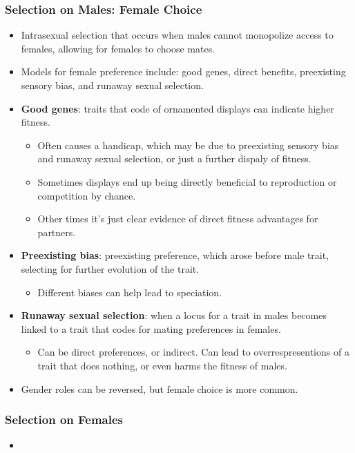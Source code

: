 \documentclass[12pt,a4paper]{article}
\begin{document}
\begin{itemize}
    \subsubsection{Selection on Males: Female Choice}
    \begin{itemize}
        \item Intrasexual selection that occurs when males cannot monopolize access to females, allowing for females to choose mates.
        \item Models for female preference include: good genes, direct benefits, preexisting sensory bias, and runaway sexual selection.
        \item \textbf{Good genes}: traits that code of ornamented displays can indicate higher fitness.
            \begin{itemize}
                \item Often causes a handicap, which may be due to preexisting sensory bias and runaway sexual selection, or just a further dispaly of fitness.
                \item Sometimes displays end up being directly beneficial to reproduction or competition by chance.
                \item Other times it's just clear evidence of direct fitness advantages for partners.
            \end{itemize}
        \item \textbf{Preexisting bias}: preexisting preference, which arose before male trait, selecting for further evolution of the trait.
            \begin{itemize}
                \item Different biases can help lead to speciation.
            \end{itemize}
        \item \textbf{Runaway sexual selection}: when a locus for a trait in males becomes linked to a trait that codes for mating preferences in females.
            \begin{itemize}
                \item Can be direct preferences, or indirect. Can lead to overrespresentions of a trait that does nothing, or even harms the fitness of males.
            \end{itemize}
        \item Gender roles can be reversed, but female choice is more common.
    \end{itemize}
    \subsubsection{Selection on Females}
    \begin{itemize}
        \item 
    \end{itemize}
\end{itemize}
\end{document}
